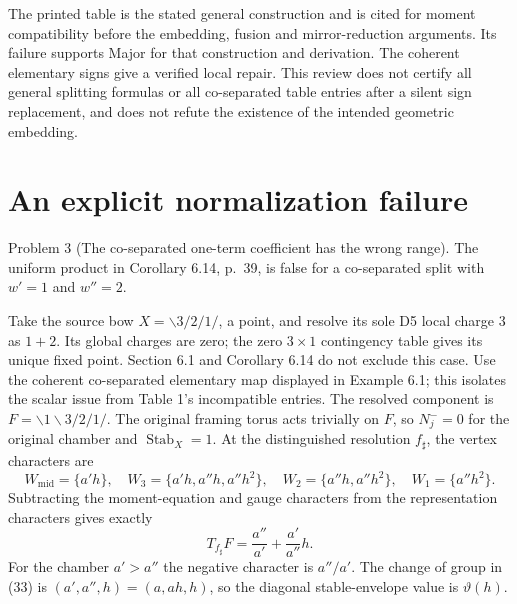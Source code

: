 \documentclass[10pt]{article}
\begin{document}
The printed table is the stated general construction and is cited for moment compatibility before the embedding, fusion and mirror-reduction arguments. Its failure supports Major for that construction and derivation. The coherent elementary signs give a verified local repair. This review does not certify all general splitting formulas or all co-separated table entries after a silent sign replacement, and does not refute the existence of the intended geometric embedding.\par
\section*{An explicit normalization failure}
Problem 3 (The co-separated one-term coefficient has the wrong range).  The uniform product in Corollary 6.14, p. 39, is false for a co-separated split with \(w'=1\) and \(w''=2\).\par
Take the source bow \(X=\backslash3/2/1/\), a point, and resolve its sole D5 local charge \(3\) as \(1+2\). Its global charges are zero; the zero \(3\times1\) contingency table gives its unique fixed point. Section 6.1 and Corollary 6.14 do not exclude this case. Use the coherent co-separated elementary map displayed in Example 6.1; this isolates the scalar issue from Table 1’s incompatible entries. The resolved component is \(F=\backslash1\backslash3/2/1/\). The original framing torus acts trivially on \(F\), so \(N_j^-=0\) for the original chamber and \(\operatorname{Stab}_X=1\). At the distinguished resolution \(f_\sharp\), the vertex characters are \[W_{\mathrm{mid}}=\{a'h\},\quad
 W_3=\{a'h,a''h,a''h^2\},\quad
 W_2=\{a''h,a''h^2\},\quad W_1=\{a''h^2\}.\] Subtracting the moment-equation and gauge characters from the representation characters gives exactly \[T_{f_\sharp}F=\frac{a''}{a'}+\frac{a'}{a''}h.\] For the chamber \(a'>a''\) the negative character is \(a''/a'\). The change of group in (33) is \((a',a'',h)=(a,ah,h)\), so the diagonal stable-envelope value is \(\vartheta(h)\).\par
\end{document}
